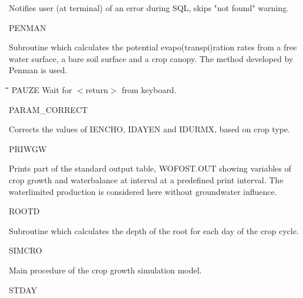 \begin{indenting}{5.08cm}
Notifies user (at terminal) of an error during SQL, skips "not
found" warning.
\end{indenting}
PENMAN
\testlastline

\begin{indenting}{5.08cm}
Subroutine which calculates the potential evapo(trans\-pi)ration
rates from a free water surface, a bare soil surface and a
crop canopy. The method developed by Penman is used.
\end{indenting}
\begin{tabbing}
\hspace{1.27cm}\=\hspace{1.27cm}\=\hspace{1.27cm}\=\hspace{1.27cm}\=%
\hspace{1.27cm}\=\hspace{1.27cm}\=\hspace{1.27cm}\=\hspace{1.27cm}\=%
\hspace{1.27cm}\=\hspace{1.27cm}\=\kill
PAUZE\> \> \> \> Wait for $<$return$>$ from keyboard.
\end{tabbing}
PARAM\_CORRECT
\testlastline

\begin{indenting}{5.08cm}
Corrects the values of IENCHO, IDAYEN and IDUR\-MX,
based on crop type.
\end{indenting}
PRIWGW
\testlastline

\begin{indenting}{5.08cm}
Prints part of the standard output table, WOFOST.OUT
showing variables of crop growth and waterbalance at inter\-val at a predefined print interval. The waterlimited produc\-tion is considered here without groundwater influence.
\end{indenting}

 \bigskip
 ROOTD
\testlastline

\begin{indenting}{5.08cm}
Subroutine which calculates the depth of the root for each
day of the crop cycle.
\end{indenting}
SIMCRO
\testlastline

\begin{indenting}{5.08cm}
Main procedure of the crop growth\-{\nobreak} simulati\-on model.
\end{indenting}
STDAY
\testlastline

